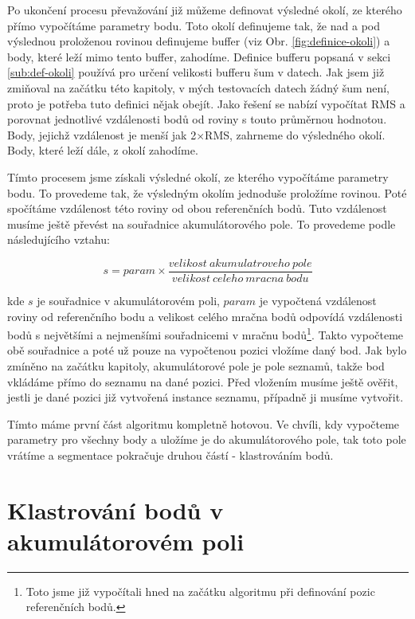 \documentclass[11pt,twoside,a4paper]{book}
\begin{document}
Po ukončení procesu převažování již můžeme definovat výsledné okolí, ze kterého přímo vypočítáme parametry bodu. Toto okolí definujeme tak, že nad a pod výslednou proloženou rovinou definujeme buffer (viz Obr. \ref{fig:definice-okoli}) a body, které leží mimo tento buffer, zahodíme. Definice bufferu popsaná v sekci \ref{sub:def-okoli} používá pro určení velikosti bufferu šum v datech. Jak jsem již zmiňoval na začátku této kapitoly, v mých testovacích datech žádný šum není, proto je potřeba tuto definici nějak obejít. Jako řešení se nabízí vypočítat RMS a porovnat jednotlivé vzdálenosti bodů od roviny s touto průměrnou hodnotou. Body, jejichž vzdálenost je menší jak 2$\times$RMS, zahrneme do výsledného okolí. Body, které leží dále, z okolí zahodíme. 

Tímto procesem jsme získali výsledné okolí, ze kterého vypočítáme parametry bodu. To provedeme tak, že výsledným okolím jednoduše proložíme rovinou. Poté spočítáme vzdá\-le\-nost této roviny od obou referenčních bodů. Tuto vzdálenost musíme ještě převést na souřadnice akumulátorového pole. To provedeme podle následujícího vztahu:

\begin{equation}
s = param \times \frac{velikost~akumulatroveho~pole}{velikost~celeho~mracna~bodu}
\end{equation}

\noindent
kde $s$ je souřadnice v akumulátorovém poli, $param$ je vypočtená vzdálenost roviny od referenčního bodu a velikost celého mračna bodů odpovídá vzdálenosti bodů s největšími a nejmenšími souřadnicemi v mračnu bodů\footnote{Toto jsme již vypočítali hned na začátku algoritmu při definování pozic referenčních bodů.}. Takto vypočteme obě souřadnice a poté už pouze na vypočtenou pozici vložíme daný bod. Jak bylo zmíněno na začátku kapitoly, akumulátorové pole je pole seznamů, takže bod vkládáme přímo do seznamu na dané pozici. Před vložením musíme ještě ověřit, jestli je dané pozici již vytvořená instance seznamu, případně ji musíme vytvořit.

Tímto máme první část algoritmu kompletně hotovou. Ve chvíli, kdy vypočteme parametry pro všechny body a uložíme je do akumulátorového pole, tak toto pole vrátíme a segmentace pokračuje druhou částí - klastrováním bodů.


\section{Klastrování bodů v akumulátorovém poli}
\label{sub:seg1-klastrovani}
\end{document}
